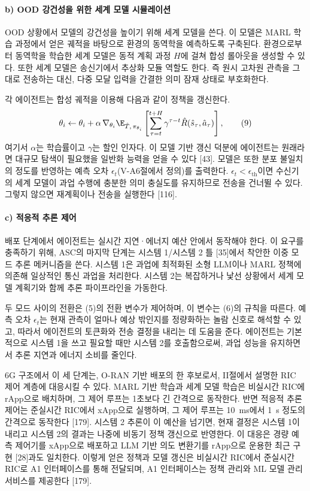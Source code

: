 \paragraph{b) OOD 강건성을 위한 세계 모델 시뮬레이션}
OOD 상황에서 모델의 강건성을 높이기 위해 세계 모델을 쓴다. 이 모델은 MARL 학습 과정에서 얻은 궤적을 바탕으로 환경의 동역학을 예측하도록 구축된다. 환경으로부터 동역학을 학습한 세계 모델은 동적 계획 과정 $H$에 걸쳐 합성 롤아웃을 생성할 수 있다. 또한 세계 모델은 송신기에서 추상화 모듈 역할도 한다. 즉 원시 고차원 관측을 그대로 전송하는 대신, 다중 모달 입력을 간결한 의미 잠재 상태로 부호화한다.

각 에이전트는 합성 궤적을 이용해 다음과 같이 정책을 갱신한다.
\begin{equation}
\theta_i \leftarrow \theta_i + \alpha\, \nabla_{\theta_i} \E_{\hat{T},\, \pi_{\theta_i}}\left[\sum_{\tau=t}^{t+H} \gamma^{\tau-t} \hat{R}(\hat{s}_\tau, \hat{a}_\tau)\right], \tag{9}
\end{equation}
여기서 $\alpha$는 학습률이고 $\gamma$는 할인 인자다. 이 모델 기반 갱신 덕분에 에이전트는 원래라면 대규모 탐색이 필요했을 일반화 능력을 얻을 수 있다 [43]. 모델은 또한 분포 불일치의 정도를 반영하는 예측 오차 $\epsilon_t$(V-A6절에서 정의)를 출력한다. $\epsilon_t < \epsilon_{\mathrm{th}}$이면 수신기의 세계 모델이 과업 수행에 충분한 의미 충실도를 유지하므로 전송을 건너뛸 수 있다. 그렇지 않으면 재계획이나 전송을 실행한다 [116].

\paragraph{c) 적응적 추론 제어}
배포 단계에서 에이전트는 실시간 지연·에너지 예산 안에서 동작해야 한다. 이 요구를 충족하기 위해, ASC의 마지막 단계는 시스템 1/시스템 2 틀 [35]에서 착안한 이중 모드 추론 메커니즘을 쓴다. 시스템 1은 과업에 최적화된 소형 LLM이나 MARL 정책에 의존해 일상적인 통신 과업을 처리한다. 시스템 2는 복잡하거나 낯선 상황에서 세계 모델 계획기와 함께 추론 파이프라인을 가동한다.

두 모드 사이의 전환은 (5)의 전환 변수가 제어하며, 이 변수는 (6)의 규칙을 따른다. 예측 오차 $\epsilon_t$는 현재 관측이 얼마나 예상 밖인지를 정량화하는 놀람 신호로 해석할 수 있고, 따라서 에이전트의 토큰화와 전송 결정을 내리는 데 도움을 준다. 에이전트는 기본적으로 시스템 1을 쓰고 필요할 때만 시스템 2를 호출함으로써, 과업 성능을 유지하면서 추론 지연과 에너지 소비를 줄인다.

6G 구조에서 이 세 단계는, O-RAN 기반 배포의 한 후보로서, II절에서 설명한 RIC 제어 계층에 대응시킬 수 있다. MARL 기반 학습과 세계 모델 학습은 비실시간 RIC에 rApp으로 배치하며, 그 제어 루프는 1초보다 긴 간격으로 동작한다. 반면 적응적 추론 제어는 준실시간 RIC에서 xApp으로 실행하며, 그 제어 루프는 10~ms에서 1~s 정도의 간격으로 동작한다 [179]. 시스템 2 추론이 이 예산을 넘기면, 현재 결정은 시스템 1이 내리고 시스템 2의 결과는 나중에 비동기 정책 갱신으로 반영한다. 이 대응은 경량 예측 제어기를 xApp으로 배포하고 LLM 기반 의도 변환기를 rApp으로 운용한 최근 구현 [28]과도 일치한다. 이렇게 얻은 정책과 모델 갱신은 비실시간 RIC에서 준실시간 RIC로 A1 인터페이스를 통해 전달되며, A1 인터페이스는 정책 관리와 ML 모델 관리 서비스를 제공한다 [179].

